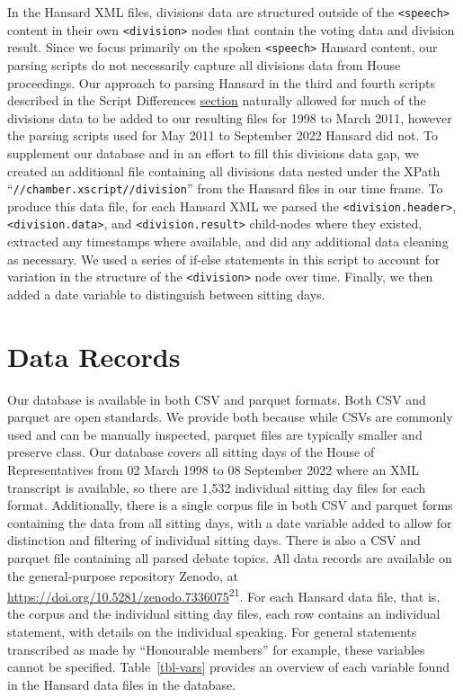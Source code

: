 \documentclass[
  letterpaper,
  DIV=11,
  numbers=noendperiod]{scrartcl}
\begin{document}
In the Hansard XML files, divisions data are structured outside of the
\texttt{\textless{}speech\textgreater{}} content in their own
\texttt{\textless{}division\textgreater{}} nodes that contain the voting
data and division result. Since we focus primarily on the spoken
\texttt{\textless{}speech\textgreater{}} Hansard content, our parsing
scripts do not necessarily capture all divisions data from House
proceedings. Our approach to parsing Hansard in the third and fourth
scripts described in the Script Differences
\protect\hyperlink{sec-diff}{section} naturally allowed for much of the
divisions data to be added to our resulting files for 1998 to March
2011, however the parsing scripts used for May 2011 to September 2022
Hansard did not. To supplement our database and in an effort to fill
this divisions data gap, we created an additional file containing all
divisions data nested under the XPath
``\texttt{//chamber.xscript//division}'' from the Hansard files in our
time frame. To produce this data file, for each Hansard XML we parsed
the \texttt{\textless{}division.header\textgreater{}},
\texttt{\textless{}division.data\textgreater{}}, and
\texttt{\textless{}division.result\textgreater{}} child-nodes where they
existed, extracted any timestamps where available, and did any
additional data cleaning as necessary. We used a series of if-else
statements in this script to account for variation in the structure of
the \texttt{\textless{}division\textgreater{}} node over time. Finally,
we then added a date variable to distinguish between sitting days.

\hypertarget{data-records}{%
\section{Data Records}\label{data-records}}

Our database is available in both CSV and parquet formats. Both CSV and
parquet are open standards. We provide both because while CSVs are
commonly used and can be manually inspected, parquet files are typically
smaller and preserve class. Our database covers all sitting days of the
House of Representatives from 02 March 1998 to 08 September 2022 where
an XML transcript is available, so there are 1,532 individual sitting
day files for each format. Additionally, there is a single corpus file
in both CSV and parquet forms containing the data from all sitting days,
with a date variable added to allow for distinction and filtering of
individual sitting days. There is also a CSV and parquet file containing
all parsed debate topics. All data records are available on the
general-purpose repository Zenodo, at
\url{https://doi.org/10.5281/zenodo.7336075}\textsuperscript{21}. For
each Hansard data file, that is, the corpus and the individual sitting
day files, each row contains an individual statement, with details on
the individual speaking. For general statements transcribed as made by
``Honourable members'' for example, these variables cannot be specified.
Table~\ref{tbl-vars} provides an overview of each variable found in the
Hansard data files in the database.
\end{document}
